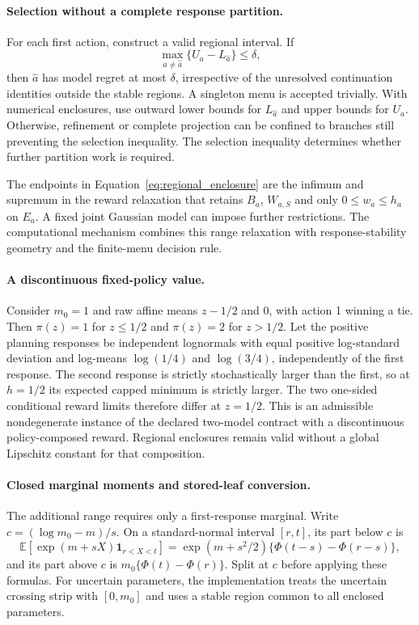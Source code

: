 \paragraph{Selection without a complete response partition.}
For each first action, construct a valid regional interval. If
\begin{equation}
\max_{a\ne\hat a}\{U_a-L_{\hat a}\}\le\delta,
\label{eq:regional_no_projection}
\end{equation}
then $\hat a$ has model regret at most $\delta$, irrespective of the unresolved continuation identities outside the stable regions. A singleton menu is accepted trivially. With numerical enclosures, use outward lower bounds for $L_{\hat a}$ and upper bounds for $U_a$. Otherwise, refinement or complete projection can be confined to branches still preventing the selection inequality. The selection inequality determines whether further partition work is required.

The endpoints in Equation~\eqref{eq:regional_enclosure} are the infimum and supremum in the reward relaxation that retains $B_a$, $W_{a,S}$ and only $0\le w_a\le h_a$ on $E_a$. A fixed joint Gaussian model can impose further restrictions. The computational mechanism combines this range relaxation with response-stability geometry and the finite-menu decision rule.

\paragraph{A discontinuous fixed-policy value.}
Consider $m_0=1$ and raw affine means $z-1/2$ and $0$, with action 1 winning a tie. Then $\pi(z)=1$ for $z\le1/2$ and $\pi(z)=2$ for $z>1/2$. Let the positive planning responses be independent lognormals with equal positive log-standard deviation and log-means $\log(1/4)$ and $\log(3/4)$, independently of the first response. The second response is strictly stochastically larger than the first, so at $h=1/2$ its expected capped minimum is strictly larger. The two one-sided conditional reward limits therefore differ at $z=1/2$. This is an admissible nondegenerate instance of the declared two-model contract with a discontinuous policy-composed reward. Regional enclosures remain valid without a global Lipschitz constant for that composition.

\paragraph{Closed marginal moments and stored-leaf conversion.}
The additional range requires only a first-response marginal. Write $c=(\log m_0-m)/s$. On a standard-normal interval $[r,t]$, its part below $c$ is
\begin{equation}
\mathbb E[\exp(m+sX)\mathbf1_{r<X<t}]
=\exp(m+s^2/2)\{\Phi(t-s)-\Phi(r-s)\},
\label{eq:regional_moment}
\end{equation}
and its part above $c$ is $m_0\{\Phi(t)-\Phi(r)\}$. Split at $c$ before applying these formulas. For uncertain parameters, the implementation treats the uncertain crossing strip with $[0,m_0]$ and uses a stable region common to all enclosed parameters.

